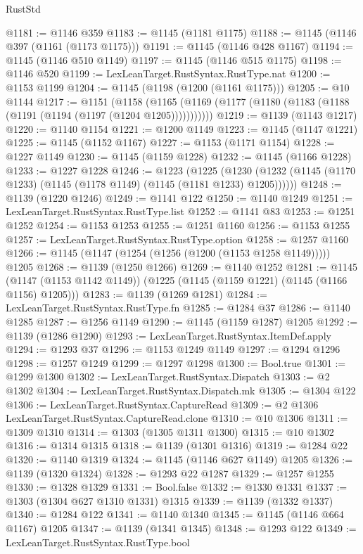 \begin{lexlean}{RustStd}
\begin{coremodule}
@1181 := @1146 @359
@1183 := @1145 (@1181 @1175)
@1188 := @1145 (@1146 @397 (@1161 (@1173 @1175)))
@1191 := @1145 (@1146 @428 @1167)
@1194 := @1145 (@1146 @510 @1149)
@1197 := @1145 (@1146 @515 @1175)
@1198 := @1146 @520
@1199 := LexLeanTarget.RustSyntax.RustType.nat
@1200 := @1153 @1199
@1204 := @1145 (@1198 (@1200 (@1161 @1175)))
@1205 := @10 @1144
@1217 := @1151
    (@1158 (@1165 (@1169 (@1177 (@1180 (@1183 (@1188 (@1191 (@1194 (@1197 (@1204 @1205)))))))))))
@1219 := @1139 (@1143 @1217)
@1220 := @1140 @1154
@1221 := @1200 @1149
@1223 := @1145 (@1147 @1221)
@1225 := @1145 (@1152 @1167)
@1227 := @1153 (@1171 @1154)
@1228 := @1227 @1149
@1230 := @1145 (@1159 @1228)
@1232 := @1145 (@1166 @1228)
@1233 := @1227 @1228
@1246 := @1223
    (@1225 (@1230 (@1232 (@1145 (@1170 @1233) (@1145 (@1178 @1149) (@1145 (@1181 @1233) @1205))))))
@1248 := @1139 (@1220 @1246)
@1249 := @1141 @122
@1250 := @1140 @1249
@1251 := LexLeanTarget.RustSyntax.RustType.list
@1252 := @1141 @83
@1253 := @1251 @1252
@1254 := @1153 @1253
@1255 := @1251 @1160
@1256 := @1153 @1255
@1257 := LexLeanTarget.RustSyntax.RustType.option
@1258 := @1257 @1160
@1266 := @1145 (@1147 (@1254 (@1256 (@1200 (@1153 @1258 @1149))))) @1205
@1268 := @1139 (@1250 @1266)
@1269 := @1140 @1252
@1281 := @1145 (@1147 (@1153 @1142 @1149)) (@1225 (@1145 (@1159 @1221) (@1145 (@1166 @1156) @1205)))
@1283 := @1139 (@1269 @1281)
@1284 := LexLeanTarget.RustSyntax.RustType.fn
@1285 := @1284 @37
@1286 := @1140 @1285
@1287 := @1256 @1149
@1290 := @1145 (@1159 @1287) @1205
@1292 := @1139 (@1286 @1290)
@1293 := LexLeanTarget.RustSyntax.ItemDef.apply
@1294 := @1293 @37
@1296 := @1153 @1249 @1149
@1297 := @1294 @1296
@1298 := @1257 @1249
@1299 := @1297 @1298
@1300 := Bool.true
@1301 := @1299 @1300
@1302 := LexLeanTarget.RustSyntax.Dispatch
@1303 := @2 @1302
@1304 := LexLeanTarget.RustSyntax.Dispatch.mk
@1305 := @1304 @122
@1306 := LexLeanTarget.RustSyntax.CaptureRead
@1309 := @2 @1306 LexLeanTarget.RustSyntax.CaptureRead.clone
@1310 := @10 @1306
@1311 := @1309 @1310
@1314 := @1303 (@1305 @1311 @1300)
@1315 := @10 @1302
@1316 := @1314 @1315
@1318 := @1139 (@1301 @1316)
@1319 := @1284 @22
@1320 := @1140 @1319
@1324 := @1145 (@1146 @627 @1149) @1205
@1326 := @1139 (@1320 @1324)
@1328 := @1293 @22 @1287
@1329 := @1257 @1255
@1330 := @1328 @1329
@1331 := Bool.false
@1332 := @1330 @1331
@1337 := @1303 (@1304 @627 @1310 @1331) @1315
@1339 := @1139 (@1332 @1337)
@1340 := @1284 @122
@1341 := @1140 @1340
@1345 := @1145 (@1146 @664 @1167) @1205
@1347 := @1139 (@1341 @1345)
@1348 := @1293 @122
@1349 := LexLeanTarget.RustSyntax.RustType.bool

\end{coremodule}
\end{lexlean}

